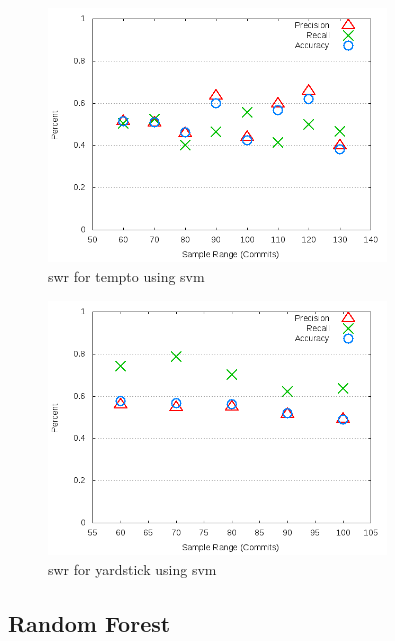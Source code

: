 \clearpage
\begin{figure}[!t]
\centering
\includegraphics[width=0.8\textwidth]{images/svm/test_1/tempto_sample_range.png}
\caption{\gls{swr} for tempto using \gls{svm}}
\label{fig:test_1_tempto_svm}
\end{figure}

\begin{figure}[!t]
\centering
\includegraphics[width=0.8\textwidth]{images/svm/test_1/yardstick_sample_range.png}
\caption{\gls{swr} for yardstick using \gls{svm}}
\label{fig:test_1_yardstick_svm}
\end{figure}

\clearpage

\subsection{Random Forest}
\label{app_sub:experiment_1_rf}

